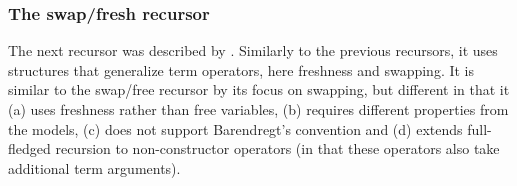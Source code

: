 \subsubsection{The swap/fresh recursor} %
\label{subsubsec-alphaFreshSwapRec}
The next recursor was described by %
\citet{DBLP:journals/jar/GheriP20}.  
Similarly to the previous recursors,  it uses %
structures that generalize term operators, here freshness and swapping.  
%
It is similar to %
the swap/free recursor by its focus on swapping, but different 
in that it (a) %
uses freshness rather than free variables, 
(b) requires different properties from the models, (c) does not %
support %
Barendregt's %
convention and (d) extends full-fledged recursion  
to non-constructor operators %
(in that these operators also take additional term arguments). %

